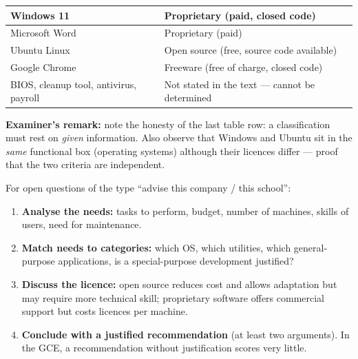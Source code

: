 \documentclass[11pt]{article}
\begin{document}
\begin{exoresolu}
\begin{enumerate}
\begin{center}
\begin{tabularx}{\linewidth}{|l|X|}
\hline
Windows 11 & Proprietary (paid, closed code) \\
\hline
Microsoft Word & Proprietary (paid) \\
\hline
Ubuntu Linux & Open source (free, source code available) \\
\hline
Google Chrome & Freeware (free of charge, closed code) \\
\hline
BIOS, cleanup tool, antivirus, payroll & Not stated in the text --- cannot be determined \\
\hline
\end{tabularx}
\end{center}
\end{enumerate}
\textbf{Examiner's remark:} note the honesty of the last table row: a classification must rest on \emph{given} information. Also observe that Windows and Ubuntu sit in the \emph{same} functional box (operating systems) although their licences differ --- proof that the two criteria are independent.
\end{exoresolu}

\begin{methode}
For open questions of the type ``advise this company / this school'':
\begin{enumerate}
\item \textbf{Analyse the needs:} tasks to perform, budget, number of machines, skills of users, need for maintenance.
\item \textbf{Match needs to categories:} which OS, which utilities, which general-purpose applications, is a special-purpose development justified?
\item \textbf{Discuss the licence:} open source reduces cost and allows adaptation but may require more technical skill; proprietary software offers commercial support but costs licences per machine.
\item \textbf{Conclude with a justified recommendation} (at least two arguments). In the GCE, a recommendation without justification scores very little.
\end{enumerate}
\end{methode}
\end{document}
